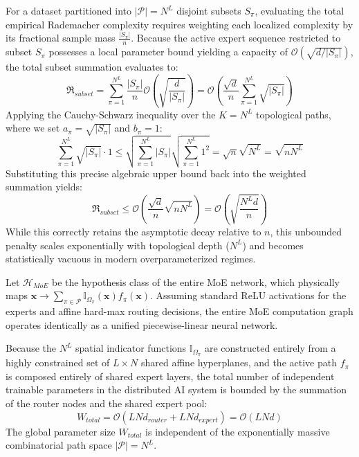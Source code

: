 \documentclass{article}
\newcommand{\1}{\mathbb{I}}
\newcommand{\calO}{\mathcal{O}}
\newcommand{\calP}{\mathcal{P}}
\newcommand{\calH}{\mathcal{H}}
\newcommand{\bx}{\mathbf{x}}
\begin{document}
For a dataset partitioned into $|\calP| = N^L$ disjoint subsets $S_\pi$, evaluating the total empirical Rademacher complexity requires weighting each localized complexity by its fractional sample mass $\frac{|S_\pi|}{n}$. Because the active expert sequence restricted to subset $S_\pi$ possesses a local parameter bound yielding a capacity of $\calO(\sqrt{d / |S_\pi|})$, the total subset summation evaluates to:
\begin{equation}
    \mathfrak{R}_{subset} = \sum_{\pi=1}^{N^L} \frac{|S_\pi|}{n} \calO\left(\sqrt{\frac{d}{|S_\pi|}}\right) = \calO\left( \frac{\sqrt{d}}{n} \sum_{\pi=1}^{N^L} \sqrt{|S_\pi|} \right)
\end{equation}
Applying the Cauchy-Schwarz inequality over the $K = N^L$ topological paths, where we set $a_\pi = \sqrt{|S_\pi|}$ and $b_\pi = 1$:
\begin{equation}
    \sum_{\pi=1}^{N^L} \sqrt{|S_\pi|} \cdot 1 \le \sqrt{\sum_{\pi=1}^{N^L} |S_\pi|} \sqrt{\sum_{\pi=1}^{N^L} 1^2} = \sqrt{n} \sqrt{N^L} = \sqrt{n N^L}
\end{equation}
Substituting this precise algebraic upper bound back into the weighted summation yields:
\begin{equation}
    \mathfrak{R}_{subset} \le \calO\left( \frac{\sqrt{d}}{n} \sqrt{n N^L} \right) = \calO\left(\sqrt{\frac{N^L d}{n}}\right)
\end{equation}
While this correctly retains the asymptotic decay relative to $n$, this unbounded penalty scales exponentially with topological depth ($N^L$) and becomes statistically vacuous \citep{dziugaite2017computing} in modern overparameterized regimes.  

Let $\calH_{MoE}$ be the hypothesis class of the entire MoE network, which physically maps $\bx \to \sum_{\pi \in \calP} \1_{\Omega_\pi}(\bx) f_\pi(\bx)$. Assuming standard ReLU activations for the experts and affine hard-max routing decisions, the entire MoE computation graph operates identically as a unified piecewise-linear neural network. 

Because the $N^L$ spatial indicator functions $\1_{\Omega_\pi}$ are constructed entirely from a highly constrained set of $L \times N$ shared affine hyperplanes, and the active path $f_\pi$ is composed entirely of shared expert layers, the total number of independent trainable parameters in the distributed AI system is bounded by the summation of the router nodes and the shared expert pool: 
\begin{equation}
    W_{total} = \calO(L N d_{router} + L N d_{expert}) = \calO(L N d)
\end{equation}
The global parameter size $W_{total}$ is independent of the exponentially massive combinatorial path space $|\calP| = N^L$.
\end{document}
